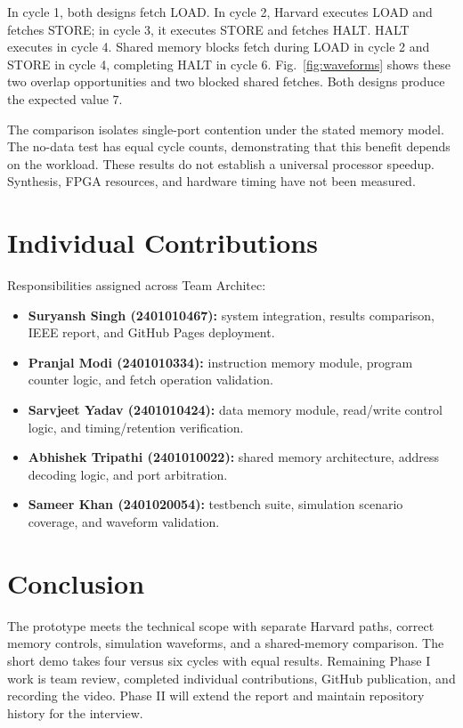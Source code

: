 \documentclass[conference,a4paper]{IEEEtran}
\begin{document}
In cycle 1, both designs fetch LOAD. In cycle 2, Harvard executes LOAD
and fetches STORE; in cycle 3, it executes STORE and fetches HALT.
HALT executes in cycle 4. Shared memory blocks fetch during LOAD in
cycle 2 and STORE in cycle 4, completing HALT in cycle 6.
Fig.~\ref{fig:waveforms} shows these two overlap opportunities and
two blocked shared fetches. Both designs produce the expected value 7.

The comparison isolates single-port contention under the stated memory
model. The no-data test has equal cycle counts, demonstrating that this
benefit depends on the workload. These results do not establish a
universal processor speedup. Synthesis, FPGA resources, and hardware
timing have not been measured.

\section{Individual Contributions}
Responsibilities assigned across Team Architec:
\begin{itemize}\setlength{\itemsep}{1pt}\setlength{\parskip}{0pt}
\item \textbf{Suryansh Singh (2401010467):} system integration, results comparison, IEEE report, and GitHub Pages deployment.
\item \textbf{Pranjal Modi (2401010334):} instruction memory module, program counter logic, and fetch operation validation.
\item \textbf{Sarvjeet Yadav (2401010424):} data memory module, read/write control logic, and timing/retention verification.
\item \textbf{Abhishek Tripathi (2401010022):} shared memory architecture, address decoding logic, and port arbitration.
\item \textbf{Sameer Khan (2401020054):} testbench suite, simulation scenario coverage, and waveform validation.
\end{itemize}

\section{Conclusion}
The prototype meets the technical scope with separate Harvard paths,
correct memory controls, simulation waveforms, and a shared-memory
comparison. The short demo takes four versus six cycles with equal
results. Remaining Phase I work is team review, completed individual
contributions, GitHub publication, and recording the video. Phase II
will extend the report and maintain repository history for the interview.
\end{document}
